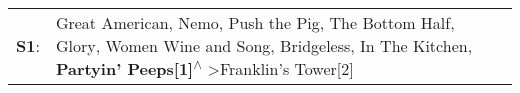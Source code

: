 \begin{supertabular}{p{0.03\textwidth}p{0.92\textwidth}}
 \textbf{S1}:  &  Great American\textsuperscript{}, \enspace Nemo\textsuperscript{}, \enspace Push the Pig\textsuperscript{}, \enspace The Bottom Half\textsuperscript{}, \enspace Glory\textsuperscript{}, \enspace Women Wine and Song\textsuperscript{}, \enspace Bridgeless\textsuperscript{}, \enspace In The Kitchen\textsuperscript{}, \enspace \textbf{Partyin' Peeps[1]\textsuperscript{$\wedge$}} \textgreater \enspace Franklin's Tower[2]\textsuperscript{}  \enspace  \\
\end{supertabular}
